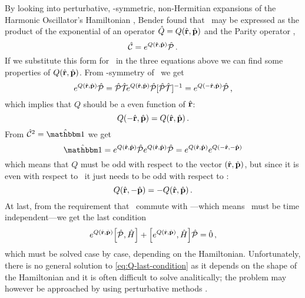             By looking into perturbative, \PT-symmetric, non-Hermitian expansions of the Harmonic Oscillator's Hamiltonian \cite{bender2024}, Bender found that \hC\ may be expressed as the product of the exponential of an operator $\hQ = Q\pqty{\hvr,\hvp}$ and the Parity operator \hP,
            \begin{equation}
                \label{eq:C-exponential}
                \hC = \myexp{Q\pqty{\hvr,\hvp}}\hP
                \myperiod
            \end{equation}
            If we substitute this form for \hC\ in the three equations above we can find some properties of $Q\pqty{\hvr,\hvp}$. From \PT-symmetry of \hC\ we get
            \begin{equation*}
                \myexp{Q\pqty{\hvr,\hvp}}\hP
                = \PTtransform{\myexp{Q\pqty{\hvr,\hvp}}\hP}
                = \myexp{Q\pqty{-\hvr,\hvp}}\hP
                \mycomma
            \end{equation*}
            which implies that $Q$ should be a even function of $\hat{\vb{r}}$:
            \begin{equation}
                Q\pqty{-\hvr,\hvp} = Q\pqty{\hvr,\hvp}
                \myperiod
            \end{equation}
            From $\hC^2 = \hidM$ we get
            \begin{equation*}
                \hidM = \myexp{Q\pqty{\hvr,\hvp}} \hP \myexp{Q\pqty{\hvr,\hvp}} \hP = \myexp{Q\pqty{\hvr,\hvp}} \myexp{Q\pqty{-\hvr,-\hvp}}
            \end{equation*}
            which means that $Q$ must be odd with respect to the vector $\pqty{\hvr,\hvp}$, but since it is even with respect to \hvr\ it just needs to be odd with respect to {\hvp}:
            \begin{equation}
                Q\pqty{\hvr,-\hvp} = -Q\pqty{\hvr,\hvp}
                \myperiod
            \end{equation}
            At last, from the requirement that \hC\ commute with \hH---which means \hC\ must be time independent---we get the last condition
            \begin{equation}
                \label{eq:Q-last-condition}
                \myexp{Q\pqty{\hvr,\hvp}} \comm{\hP}{\hH} + \comm{\myexp{Q\pqty{\hvr,\hvp}}}{\hH} \hP = \hzero
                \mycomma
            \end{equation}
            which must be solved case by case, depending on the Hamiltonian. Unfortunately, there is no general solution to \eqref{eq:Q-last-condition} as it depends on the shape of the Hamiltonian and it is often difficult to solve analitically; the problem may however be approached by using perturbative methods \cite{bender2024}.

